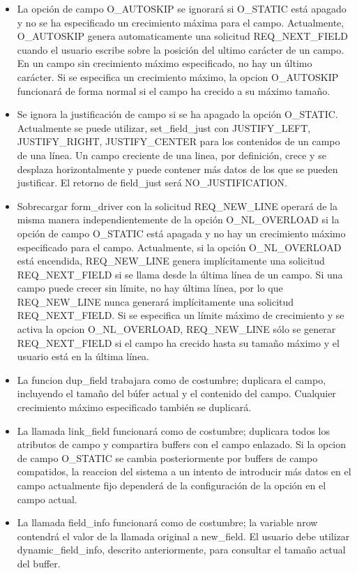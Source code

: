 \documentclass{article}
\begin{document}
\begin{itemize}
  \item La opción de campo O\_AUTOSKIP se ignorará si O\_STATIC está apagado y no
    se ha especificado un crecimiento máxima para el campo. Actualmente,
    O\_AUTOSKIP genera automaticamente una solicitud REQ\_NEXT\_FIELD cuando el
    usuario escribe sobre la posición del ultimo carácter de un campo. En un
    campo sin crecimiento máximo especificado, no hay un último carácter. Si se
    especifica un crecimiento máximo, la opcion O\_AUTOSKIP funcionará de forma
    normal si el campo ha crecido a su máximo tamaño.
  \item Se ignora la justificación de campo si se ha apagado la opción
    O\_STATIC. Actualmente se puede utilizar, set\_field\_just con JUSTIFY\_LEFT,
    JUSTIFY\_RIGHT, JUSTIFY\_CENTER para los contenidos de un campo de una línea.
    Un campo creciente de una linea, por definición, crece y se desplaza
    horizontalmente y puede contener más datos de los que se pueden justificar.
    El retorno de field\_just será NO\_JUSTIFICATION.
  \item Sobrecargar form\_driver con la solicitud REQ\_NEW\_LINE operará de la
    misma manera independientemente de la opción O\_NL\_OVERLOAD si la opción de
    campo O\_STATIC está apagada y no hay un crecimiento máximo especificado
    para el campo. Actualmente, si la opción O\_NL\_OVERLOAD está encendida,
    REQ\_NEW\_LINE genera implícitamente una solicitud REQ\_NEXT\_FIELD si se llama
    desde la última línea de un campo. Si una campo puede crecer sin límite, no
    hay última línea, por lo que REQ\_NEW\_LINE nunca generará implícitamente una
    solicitud REQ\_NEXT\_FIELD. Si se especifica un límite máximo de crecimiento
    y se activa la opcion O\_NL\_OVERLOAD, REQ\_NEW\_LINE sólo se generar
    REQ\_NEXT\_FIELD si el campo ha crecido hasta su tamaño máximo y el usuario
    está en la última línea.
  \item La funcion dup\_field trabajara como de costumbre; duplicara el campo,
    incluyendo el tamaño del búfer actual y el contenido del campo. Cualquier
    crecimiento máximo especificado también se duplicará.
  \item La llamada link\_field funcionará como de costumbre; duplicara todos los
    atributos de campo y compartira buffers con el campo enlazado. Si la opcion
    de campo O\_STATIC se cambia posteriormente por buffers de campo compatidos,
    la reaccion del sistema a un intento de introducir más datos en el campo
    actualmente fijo dependerá de la configuración de la opción en el campo
    actual.
  \item La llamada field\_info funcionará como de costumbre; la variable nrow
    contendrá el valor de la llamada original a new\_field. El usuario debe
    utilizar dynamic\_field\_info, descrito anteriormente, para consultar el
    tamaño actual del buffer.
\end{itemize}
\end{document}
